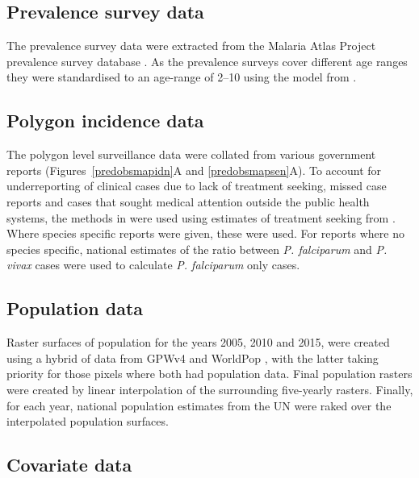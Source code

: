 \documentclass[10pt,letterpaper]{article}
\begin{document}
\subsection*{Prevalence survey data}

The prevalence survey data were extracted from the Malaria Atlas Project prevalence survey database \cite{bhatt2015effect}.
As the prevalence surveys cover different age ranges they were standardised to an age-range of 2--10 using the model from \cite{smith2007standardizing}.


\subsection*{Polygon incidence data}

The polygon level surveillance data were collated from various government reports (Figures~\ref{predobsmapidn}A and \ref{predobsmapsen}A).
To account for underreporting of clinical cases due to lack of treatment seeking, missed case reports and cases that sought medical attention outside the public health systems, the methods in \cite{cibulskis2011worldwide} were used using estimates of treatment seeking from \cite{battle2016treatment}.
Where species specific reports were given, these were used. 
For reports where no species specific, national estimates of the ratio between \emph{P. falciparum} and \emph{P. vivax} cases were used to calculate \emph{P. falciparum} only cases.



\subsection*{Population data}

Raster surfaces of population for the years 2005, 2010 and 2015, were created using a hybrid of data from GPWv4 \cite{gpw4} and WorldPop \cite{tatem2017worldpop}, with the latter taking priority for those pixels where both had population data. 
Final population rasters were created by linear interpolation of the surrounding five-yearly rasters.
Finally, for each year, national population estimates from the UN were raked over the interpolated population surfaces. 

\subsection*{Covariate data}
\end{document}
